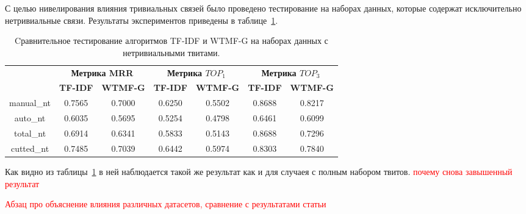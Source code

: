     С целью нивелирования влияния тривиальных связей было проведено тестирование на наборах данных, которые содержат исключительно нетривиальные связи.
    Результаты экспериментов приведены в таблице~\ref{tabular:tfidf_wmtfg_nt}.

    \begin{table}[ht!]
    \caption{Cравнительное тестирование алгоритмов TF-IDF и WTMF-G на наборах данных с нетривиальными твитами. \bigskip}
    \centering

    \label{tabular:tfidf_wmtfg_nt}
        \begin{tabular}{|c|c|c|c|c|c|c|}
            \hline
            \bf{\multirow{2}{*}{\specialcell{Набор данных}}} &
            \multicolumn{2}{|c|}{\bf{Метрика MRR}} &
            \multicolumn{2}{|c|}{\bf{Метрика $TOP_1$}} &
            \multicolumn{2}{|c|}{\bf{Метрика $TOP_3$}} \\ \cline{2-7}
            & \bf{TF-IDF} & \bf{WTMF-G} & \bf{TF-IDF} & \bf{WTMF-G} & \bf{TF-IDF} & \bf{WTMF-G} \\ \hline
            manual\_nt & 0.7565 & 0.7000 & 0.6250 & 0.5502 & 0.8688 & 0.8217 \\ \hline
            auto\_nt   & 0.6035 & 0.5695 & 0.5254 & 0.4798 & 0.6461 & 0.6099 \\ \hline
            total\_nt  & 0.6914 & 0.6341 & 0.5833 & 0.5143 & 0.8688 & 0.7296 \\ \hline
            cutted\_nt & 0.7485 & 0.7039 & 0.6442 & 0.5974 & 0.8303 & 0.7840 \\ \hline
        \end{tabular}
    \end{table}

    Как видно из таблицы~\ref{tabular:tfidf_wmtfg_nt} в ней наблюдается такой же результат как и для случаея с полным набором твитов.
    \textcolor{red}{почему снова завышенный результат}

    \textcolor{red}{Абзац про объяснение влияния различных датасетов, сравнение с результатами статьи}

